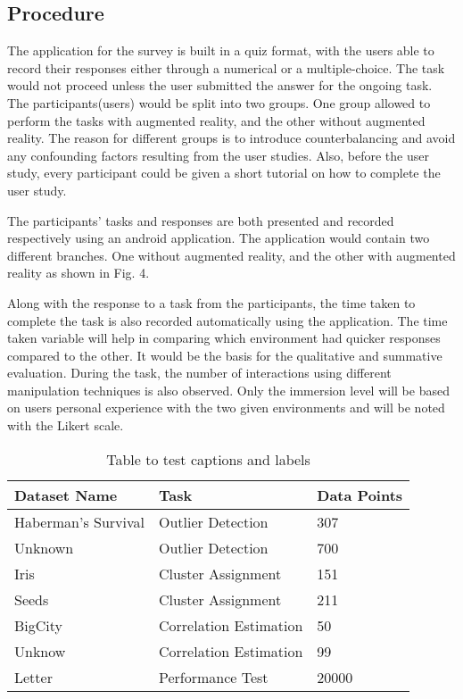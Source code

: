 \documentclass[journal]{vgtc}                %
\begin{document}
\subsection{Procedure}

The application for the survey is built in a quiz format, with the users able to record their responses either through a numerical or a multiple-choice. The task would not proceed unless the user submitted the answer for the ongoing task. The participants(users) would be split into two groups. One group allowed to perform the tasks with augmented reality, and the other without augmented reality. The reason for different groups is to introduce counterbalancing and avoid any confounding factors resulting from the user studies. Also, before the user study, every participant could be given a short tutorial on how to complete the user study.

The participants' tasks and responses are both presented and recorded respectively using an android application. The application would contain two different branches. One without augmented reality, and the other with augmented reality as shown in Fig. 4.

Along with the response to a task from the participants, the time taken to complete the task is also recorded automatically using the application. The time taken variable will help in comparing which environment had quicker responses compared to the other. It would be the basis for the qualitative and summative evaluation\cite{Lewis}. During the task, the number of interactions using different manipulation techniques is also observed. Only the immersion level will be based on users personal experience with the two given environments and will be noted with the Likert scale. 

\begin{table}
\begin{center}
\def\arraystretch{1.25}%
\begin{tabular}{ |l|l|l| } 
 \hline
 \textbf{Dataset Name} & \textbf{Task} & \textbf{Data Points} \\ 
 \hline
 \hline
 Haberman’s Survival & Outlier Detection & 307 \\ 
 \hline
 Unknown & Outlier Detection & 700 \\ 
 \hline
 Iris & Cluster Assignment & 151 \\ 
 \hline 
 Seeds & Cluster Assignment & 211 \\ 
 \hline
 BigCity & Correlation Estimation & 50 \\ 
 \hline
 Unknow & Correlation Estimation & 99 \\ 
 \hline
 Letter & Performance Test & 20000 \\ 
 \hline
\end{tabular}
\caption{Table to test captions and labels}
\label{table:1}
\end{center}
\end{table}
\end{document}

